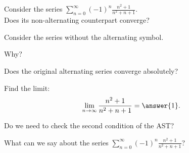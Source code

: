 \documentclass{ximera}
\begin{document}
\begin{problem}
Consider the series $\displaystyle{\sum_{n=0}^\infty (-1)^n \frac{n^2 + 1}{n^2 + n + 1}}$.\\
Does its non-alternating counterpart converge?
\begin{hint} 
Consider the series without the alternating symbol.
\end{hint}
\begin{multipleChoice}
\end{multipleChoice}

Why?
\begin{multipleChoice}
\end{multipleChoice}




Does the original alternating series converge absolutely?
\begin{multipleChoice}
\end{multipleChoice}



Find the limit:
\[
\lim_{n\to\infty} \frac{n^2 + 1}{n^2 + n + 1} = \answer{1}.
\]

Do we need to check the second condition of the AST?
\begin{multipleChoice}
\end{multipleChoice}


What can we say about the series $\displaystyle{\sum_{n=0}^\infty (-1)^n \frac{n^2 + 1}{n^2 + n + 1}}$?
\begin{multipleChoice}
\end{multipleChoice}

\end{problem}
\end{document}
